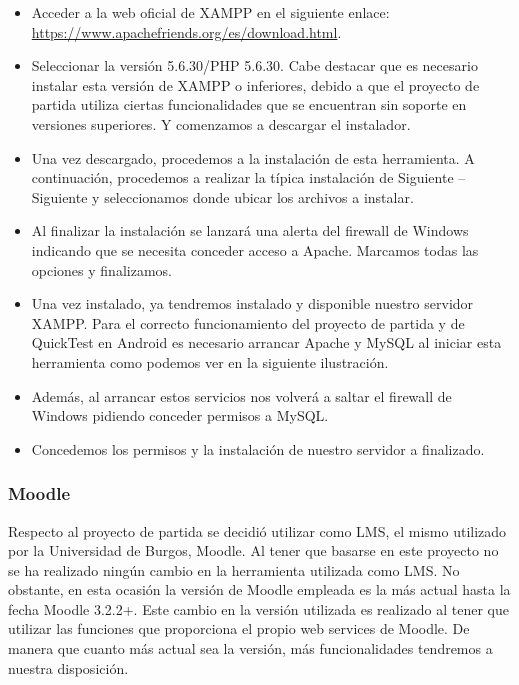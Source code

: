 \begin{itemize}

	\item Acceder a la web oficial de XAMPP en el siguiente enlace:
\url{https://www.apachefriends.org/es/download.html}.

	\item Seleccionar la versión 5.6.30/PHP 5.6.30. Cabe destacar que es necesario instalar esta versión de XAMPP o inferiores, debido a que el proyecto de partida utiliza ciertas funcionalidades que se encuentran sin soporte en versiones superiores. Y comenzamos a descargar el instalador. 
	
	\item Una vez descargado, procedemos a la instalación de esta herramienta. A continuación, procedemos a realizar la típica instalación de Siguiente – Siguiente y seleccionamos donde ubicar los archivos a instalar.
	
	\item Al finalizar la instalación se lanzará una alerta del firewall de Windows indicando que se necesita conceder acceso a Apache. Marcamos todas las opciones y finalizamos. 
	\item Una vez instalado, ya tendremos instalado y disponible nuestro servidor XAMPP. Para el correcto funcionamiento del proyecto de partida y de QuickTest en Android es necesario arrancar Apache y MySQL al iniciar esta herramienta como podemos ver en la siguiente ilustración. 
	
	\item Además, al arrancar estos servicios nos volverá a saltar el firewall de Windows pidiendo conceder permisos a MySQL. 
	
	\item Concedemos los permisos y la instalación de nuestro servidor a finalizado.


\end{itemize}

\subsubsection{Moodle}\label{subsec:moodle}

Respecto al proyecto de partida se decidió utilizar como LMS, el mismo utilizado por la Universidad de Burgos, Moodle. Al tener que basarse en este proyecto no se ha realizado ningún cambio en la herramienta utilizada como LMS.
No obstante, en esta ocasión la versión de Moodle empleada es la más actual hasta la fecha Moodle 3.2.2+. Este cambio en la versión utilizada es realizado al tener que utilizar las funciones que proporciona el propio web services de Moodle. De manera que cuanto más actual sea la versión, más funcionalidades tendremos a nuestra disposición.

